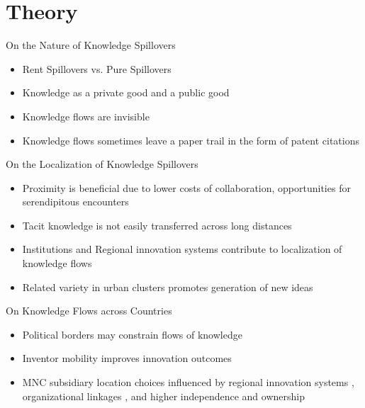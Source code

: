 \documentclass{beamer}
\begin{document}
\section{Theory}
\begin{frame}{On the Nature of Knowledge Spillovers}{}
\begin{itemize}
\item{Rent Spillovers vs. Pure Spillovers \citep{Griliches1979}}
\item{Knowledge as a private good and a public good \citep{Arrow1962}}
\item{Knowledge flows are invisible \citep{Krugman1991a}}
\item{Knowledge flows sometimes leave a paper trail in the form of patent citations \citep{Jaffe1993}}
\end{itemize}
\end{frame}

\begin{frame}{On the Localization of Knowledge Spillovers}{}
\begin{itemize}
\item{Proximity is beneficial due to lower costs of collaboration, opportunities for serendipitous encounters}
\item{Tacit knowledge is not easily transferred across long distances}
\item{Institutions and Regional innovation systems contribute to localization of knowledge flows}
\item{Related variety \citep*{Boschma2009, Frenken2007, Jacobs1969} in urban clusters promotes generation of new ideas}
\end{itemize}
\end{frame}

\begin{frame}{On Knowledge Flows across Countries}{}
\begin{itemize}
\item{Political borders may constrain flows of knowledge \citep{Singh2013}}
\item{Inventor mobility improves innovation outcomes \citep{Alnuaimi2012a}}
\item{MNC subsidiary location choices influenced by regional innovation systems \citep{Andersen2005}, organizational linkages \citep{Zhao2006}, and higher independence and ownership \citep{Pearce1999}}
\end{itemize}
\end{frame}
\end{document}
